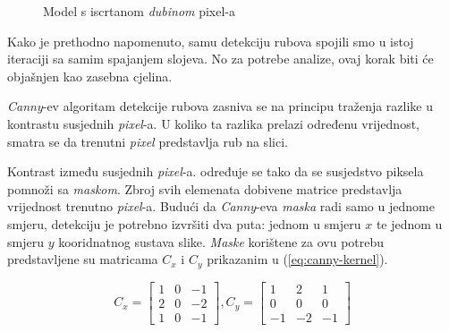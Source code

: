 \begin{figure}[H]
\centering{}
\caption{Model s iscrtanom \emph{dubinom} pixel-a}
\label{fig:monkey-depth}
\end{figure}

Kako je prethodno napomenuto, samu detekciju rubova spojili smo u istoj iteraciji sa samim spajanjem slojeva. No za potrebe analize, ovaj korak biti će objašnjen kao zasebna cjelina.

\emph{Canny}-ev algoritam detekcije rubova\cite{opencv-canny} zasniva se na principu traženja razlike u kontrastu susjednih \emph{pixel}-a. U koliko ta razlika prelazi određenu vrijednost, smatra se da trenutni \emph{pixel} predstavlja rub na slici.

Kontrast između susjednih \emph{pixel}-a. određuje se tako da se susjedstvo piksela pomnoži sa \emph{maskom}. Zbroj svih elemenata dobivene matrice predstavlja vrijednost trenutno \emph{pixel}-a. Budući da \emph{Canny}-eva \emph{maska} radi samo u jednome smjeru, detekciju je potrebno izvršiti dva puta: jednom u smjeru $x$ te jednom u smjeru $y$ kooridnatnog sustava slike. \emph{Maske} korištene za ovu potrebu predstavljene su matricama $C_x$ i $C_y$ prikazanim u (\ref{eq:canny-kernel}).

\begin{equation}
\label{eq:canny-kernel}
	C_x = 
	\begin{bmatrix}
		1 & 0 & -1\\
		2 & 0 & -2\\
		1 & 0 & -1
	\end{bmatrix},
	C_y = 
	\begin{bmatrix}
		1 & 2 & 1\\
		0 & 0 & 0\\
		-1 & -2 & -1
	\end{bmatrix}
\end{equation}

